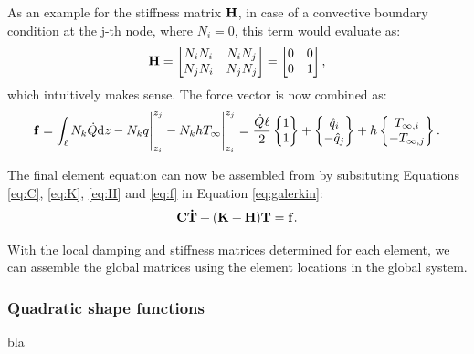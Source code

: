 \documentclass[10pt, a4paper, twoside, headinclude,footinclude, BCOR5mm]{scrartcl}
\begin{document}
As an example for the stiffness matrix \(\bold{H}\), in case of a convective boundary condition at the j-th node, where \(N_i = 0\), this term would evaluate as:
\begin{equation*}
  \bold{H} = \left[\begin{matrix} N_i N_i & N_i N_j \\
                                  N_j N_i & N_j N_j \end{matrix}\right] =
             \left[\begin{matrix} 0 & 0 \\
                                  0 & 1 \end{matrix}\right],
\end{equation*}
which intuitively makes sense. The force vector is now combined as:
\begin{equation}
\label{eq:f}
\bold{f} = \int_\ell N_k \dot{Q} \text{d}z - N_k q \Biggr|_{z_i}^{z_j} -          N_k h T_{\infty} \Biggr|_{z_i}^{z_j} =
           \frac{\dot{Q}\ell}{2}\begin{Bmatrix} 1 \\ 1\end{Bmatrix} +
           \begin{Bmatrix}  \hat{q}_i \\
                            -\hat{q}_j \end{Bmatrix} +
           h\begin{Bmatrix}  T_{\infty,i} \\
                             -T_{\infty,j} \end{Bmatrix}.
\end{equation}

The final element equation can now be assembled from by subsituting Equations \ref{eq:C}, \ref{eq:K}, \ref{eq:H} and \ref{eq:f} in Equation \ref{eq:galerkin}:
\begin{equation*}
\bold{C}\bold{\dot{T}} + (\bold{K} + \bold{H})\bold{T} = \bold{f}.
\end{equation*}

With the local damping and stiffness matrices determined for each element, we can assemble  the global matrices using the element locations in the global system.

\subsubsection{Quadratic shape functions}
\label{sec:org9310202}

bla
\end{document}
